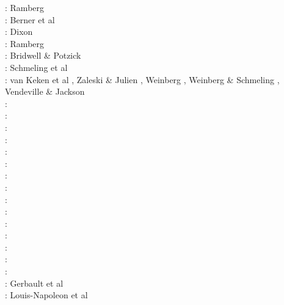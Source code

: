 \begin{scriptsize}
\nineteensixtyeight: Ramberg \cite{ramb68}\\
\nineteenseventytwo: Berner et al \cite{bers72}\\
\nineteenseventyfive: Dixon \cite{dixo75}\\
\nineteeneighty: Ramberg \cite{ramb80}\\
\nineteeneightyone: Bridwell \& Potzick \cite{brpo81}\\
\nineteeneightyeight: Schmeling et al \cite{sccm88}\\
\nineteenninetytwo: van Keken et al \cite{vayv92}, Zaleski \& Julien \cite{zaju92}, 
                    Weinberg \cite{wein92}, Weinberg \& Schmeling \cite{wesc92},
                    Vendeville \& Jackson \cite{veja92}\cite{pepp92}\\
\nineteenninetythree: \cite{kesb93}\cite{nabr93}\cite{potp93}\cite{povp93}\cite{vasv93}\cite{pocp93}\cite{popt93}\cite{wein93}\cite{vayv93}\\
\nineteenninetyfour: \cite{wepo94}\\
\nineteenninetyfive: \cite{wepo95}\cite{bisc95}\cite{wepo95}\cite{crks95}\\
\nineteenninetyseven: \cite{wein97}\\
\nineteenninetynine: \cite{drdv99}\\
\twothousandone: \cite{kapo01}\cite{drvc01}\\
\twothousandthree: \cite{geur03}\cite{vavd03}\\
\twothousandfour: \cite{gepm04}\cite{istt04}\cite{geur04}\\
\twothousandseven: \cite{gebu07}\\
\twothousandeight: \cite{buge08}\cite{zlfd08}\cite{mohc98}\\
\twothousandeleven: \cite{ellw11}\cite{pege11}\\
\twothousandthirteen: \cite{fusc13}\\
\twothousandfourteen: \cite{feka14b}\\
\twothousandfifteen: \cite{feka15}\cite{fuks15}\\
\twothousandsixteen: \cite{cakp16}\\
\twothousandeighteen: Gerbault et al \cite{gesr18}\\
\twothousandtwenty: Louis-Napoleon et al \cite{logb20}
\end{scriptsize}

